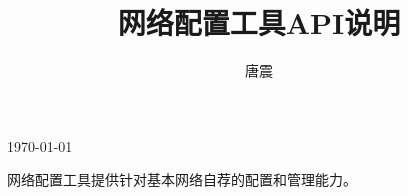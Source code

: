 \documentclass{article}
\begin{document}
\title{网络配置工具API说明}
\author{唐震}

\maketitle
\today

网络配置工具提供针对基本网络自荐的配置和管理能力。
\end{document}
